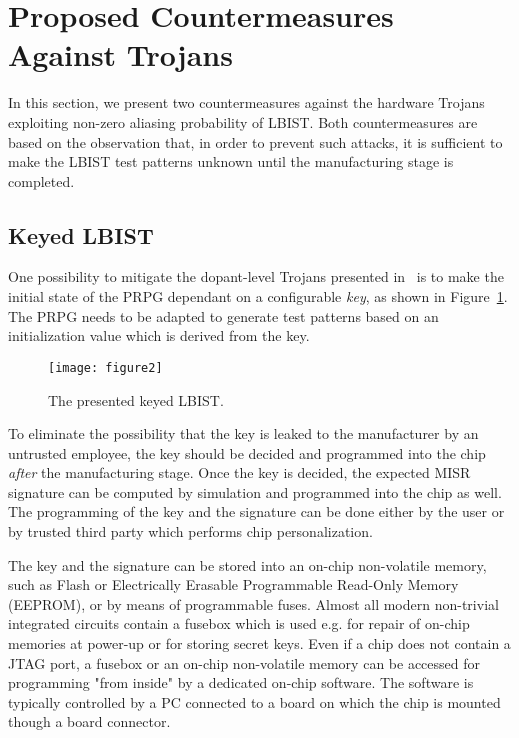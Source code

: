 \documentclass[a4paper]{llncs}
\begin{document}
\section{Proposed Countermeasures Against Trojans} \label{pres}

In this section, we present two countermeasures against the hardware Trojans exploiting non-zero aliasing probability of LBIST.
Both countermeasures are based on the observation that, in order to prevent such attacks, it is sufficient to make the LBIST test patterns unknown until the manufacturing stage is completed. 


\subsection{Keyed LBIST} \label{pres1}

One possibility to mitigate the dopant-level Trojans presented in~\cite{BeRPB13} is to make the initial state of the PRPG dependant on a configurable {\em key}, as shown in Figure~\ref{f2}. The PRPG needs to be adapted to generate test patterns based on an initialization value which is derived from the key.


\begin{figure}[t!]
\begin{center}
\texttt{[image: figure2]}
\caption{The presented keyed LBIST.}\label{f2} 
\end{center}
\end{figure}


To eliminate the possibility that the key is leaked to the manufacturer by an untrusted employee, the key should be decided and programmed into the chip {\em after} the manufacturing stage. 
Once the key is decided, the expected MISR signature can be computed by simulation and programmed into the chip as well.
The programming of the key and the signature can be done either by the user or by trusted third party which performs chip personalization.

The key and the signature can be stored into an on-chip non-volatile memory, such as Flash or Electrically Erasable Programmable Read-Only Memory (EEPROM), or by means of programmable fuses. 
Almost all modern non-trivial integrated circuits contain a fusebox which is used e.g. for repair of on-chip memories at power-up or for storing secret keys. 
Even if a chip does not contain a JTAG port,
a fusebox or an on-chip non-volatile memory can be accessed for programming "from inside" by a dedicated on-chip software. The software is typically controlled by a PC connected to a board on which the chip is mounted though a board connector. 
\end{document}
